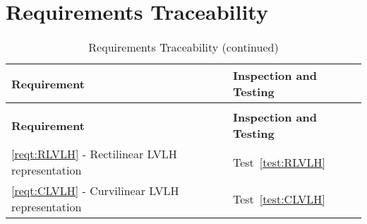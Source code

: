 \section{Requirements Traceability}

\begin{longtable}[c]{||p{3.5in}|p{3.5in}|}
\caption{Requirements Traceability} \\[6pt]
\hline
{\bf Requirement} & {\bf Inspection and Testing} \\ 
\hline \hline
\endfirsthead
\hline
\endfoot
\caption[]{Requirements Traceability (continued)} \\[6pt]
\hline
{\bf Requirement} & {\bf Inspection and Testing} \\ 
\hline \hline
\endhead
\ref{reqt:RLVLH} - Rectilinear LVLH representation &
  Test~\ref{test:RLVLH} \\ \hline

\ref{reqt:CLVLH} - Curvilinear LVLH representation &
  Test~\ref{test:CLVLH} \\ \hline

\end{longtable}
